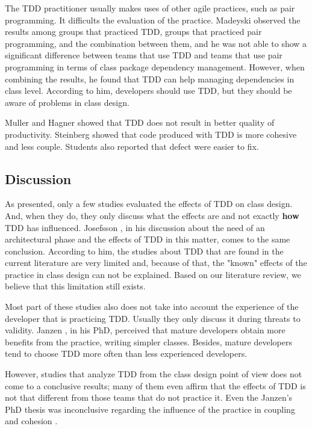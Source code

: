 \documentclass[conference]{IEEEtran}
\begin{document}
The TDD practitioner usually makes uses of other agile practices, such as
pair programming. It difficults the evaluation of the practice.
Madeyski \cite{madeyski-package-dependencies} observed the results
among groups that practiced TDD, groups that practiced pair programming,
and the combination between them, and he was not able to show a significant
difference between teams that use TDD and teams that use pair programming
in terms of class package dependency management. However, when combining
the results, he found that TDD can help managing dependencies in class level.
According to him, developers should use TDD, but they should be aware of 
problems in class design.

Muller and Hagner \cite{muller-e-hagner} showed that TDD does not result in
better quality of productivity. Steinberg \cite{steinberg} showed that
code produced with TDD is more cohesive and less couple. Students also reported
that defect were easier to fix.

\subsection{Discussion}

As presented, only a few studies evaluated the effects of TDD on class design.
And, when they do, they only discuss what the effects are and not exactly
\textbf{how} TDD has influenced. Josefsson \cite{josefsson}, in his discussion
about the need of an architectural phase and the effects of TDD in this matter,
comes to the same conclusion. According to him, the studies about TDD that are
found in the current literature are very limited and, because of that, the
"known" effects of the practice in class design can not be explained. Based on
our literature review, we believe that this limitation still exists.

Most part of these studies also does not take into account the experience
of the developer that is practicing TDD. Usually they only discuss it
during threats to validity. Janzen \cite{janzen-phd}, in his PhD, perceived
that mature developers obtain more benefits from the practice, writing simpler
classes. Besides, mature developers tend to choose TDD more often than
less experienced developers.

However, studies that analyze TDD from the class design point of view does not
come to a conclusive results; many of them even affirm that the effects of TDD
is not that different from those teams that do not practice it. Even the Janzen's PhD
thesis was inconclusive regarding the influence of the practice in coupling
and cohesion \cite{janzen-phd}. 
\end{document}
